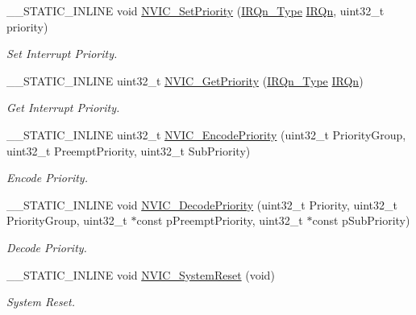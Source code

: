 \begin{DoxyCompactItemize}
\+\_\+\+\_\+\+S\+T\+A\+T\+I\+C\+\_\+\+I\+N\+L\+I\+NE void \mbox{\hyperlink{group__CMSIS__Core__NVICFunctions_ga2305cbd44aaad792e3a4e538bdaf14f9}{N\+V\+I\+C\+\_\+\+Set\+Priority}} (\mbox{\hyperlink{group__SAME70J19__cmsis_gac3af4a32370fb28c4ade8bf2add80251}{I\+R\+Qn\+\_\+\+Type}} \mbox{\hyperlink{group__SAME70J19__cmsis_ga666eb0caeb12ec0e281415592ae89083}{I\+R\+Qn}}, uint32\+\_\+t priority)
\begin{DoxyCompactList}\small\item\em Set Interrupt Priority. \end{DoxyCompactList}\item 
\+\_\+\+\_\+\+S\+T\+A\+T\+I\+C\+\_\+\+I\+N\+L\+I\+NE uint32\+\_\+t \mbox{\hyperlink{group__CMSIS__Core__NVICFunctions_ga1cbaf8e6abd4aa4885828e7f24fcfeb4}{N\+V\+I\+C\+\_\+\+Get\+Priority}} (\mbox{\hyperlink{group__SAME70J19__cmsis_gac3af4a32370fb28c4ade8bf2add80251}{I\+R\+Qn\+\_\+\+Type}} \mbox{\hyperlink{group__SAME70J19__cmsis_ga666eb0caeb12ec0e281415592ae89083}{I\+R\+Qn}})
\begin{DoxyCompactList}\small\item\em Get Interrupt Priority. \end{DoxyCompactList}\item 
\+\_\+\+\_\+\+S\+T\+A\+T\+I\+C\+\_\+\+I\+N\+L\+I\+NE uint32\+\_\+t \mbox{\hyperlink{group__CMSIS__Core__NVICFunctions_gadb94ac5d892b376e4f3555ae0418ebac}{N\+V\+I\+C\+\_\+\+Encode\+Priority}} (uint32\+\_\+t Priority\+Group, uint32\+\_\+t Preempt\+Priority, uint32\+\_\+t Sub\+Priority)
\begin{DoxyCompactList}\small\item\em Encode Priority. \end{DoxyCompactList}\item 
\+\_\+\+\_\+\+S\+T\+A\+T\+I\+C\+\_\+\+I\+N\+L\+I\+NE void \mbox{\hyperlink{group__CMSIS__Core__NVICFunctions_ga3387607fd8a1a32cccd77d2ac672dd96}{N\+V\+I\+C\+\_\+\+Decode\+Priority}} (uint32\+\_\+t Priority, uint32\+\_\+t Priority\+Group, uint32\+\_\+t $\ast$const p\+Preempt\+Priority, uint32\+\_\+t $\ast$const p\+Sub\+Priority)
\begin{DoxyCompactList}\small\item\em Decode Priority. \end{DoxyCompactList}\item 
\+\_\+\+\_\+\+S\+T\+A\+T\+I\+C\+\_\+\+I\+N\+L\+I\+NE void \mbox{\hyperlink{group__CMSIS__Core__NVICFunctions_ga1143dec48d60a3d6f238c4798a87759c}{N\+V\+I\+C\+\_\+\+System\+Reset}} (void)
\begin{DoxyCompactList}\small\item\em System Reset. \end{DoxyCompactList}\end{DoxyCompactItemize}


